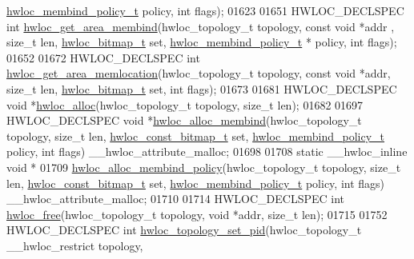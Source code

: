 \begin{DoxyCode}
      \hyperlink{a00191_gac9764f79505775d06407b40f5e4661e8}{hwloc\_membind\_policy\_t} policy, \textcolor{keywordtype}{int} flags);
01623 
01651 HWLOC\_DECLSPEC \textcolor{keywordtype}{int} \hyperlink{a00191_gaa87e0a6946ff145914fdf0b1c60567f8}{hwloc\_get\_area\_membind}(hwloc\_topology\_t topology, \textcolor{keyword}{const} \textcolor{keywordtype}{void} *addr
      , \textcolor{keywordtype}{size\_t} len, \hyperlink{a00205_gaa3c2bf4c776d603dcebbb61b0c923d84}{hwloc\_bitmap\_t} \textcolor{keyword}{set}, \hyperlink{a00191_gac9764f79505775d06407b40f5e4661e8}{hwloc\_membind\_policy\_t} * policy, \textcolor{keywordtype}{int} 
      flags);
01652 
01672 HWLOC\_DECLSPEC \textcolor{keywordtype}{int} \hyperlink{a00191_ga537c7508a4e2d1db05673ec5be6e805c}{hwloc\_get\_area\_memlocation}(hwloc\_topology\_t topology, \textcolor{keyword}{const} \textcolor{keywordtype}{
      void} *addr, \textcolor{keywordtype}{size\_t} len, \hyperlink{a00205_gaa3c2bf4c776d603dcebbb61b0c923d84}{hwloc\_bitmap\_t} \textcolor{keyword}{set}, \textcolor{keywordtype}{int} flags);
01673 
01681 HWLOC\_DECLSPEC \textcolor{keywordtype}{void} *\hyperlink{a00191_ga972b335a86a7d5e7b34bce2b243c41bc}{hwloc\_alloc}(hwloc\_topology\_t topology, \textcolor{keywordtype}{size\_t} len);
01682 
01697 HWLOC\_DECLSPEC \textcolor{keywordtype}{void} *\hyperlink{a00191_ga04736461780fadcf193af218c0122273}{hwloc\_alloc\_membind}(hwloc\_topology\_t topology, \textcolor{keywordtype}{size\_t} len, 
      \hyperlink{a00205_gae991a108af01d408be2776c5b2c467b2}{hwloc\_const\_bitmap\_t} \textcolor{keyword}{set}, \hyperlink{a00191_gac9764f79505775d06407b40f5e4661e8}{hwloc\_membind\_policy\_t} policy, \textcolor{keywordtype}{int} 
      flags) \_\_hwloc\_attribute\_malloc;
01698 
01708 \textcolor{keyword}{static} \_\_hwloc\_inline \textcolor{keywordtype}{void} *
01709 \hyperlink{a00191_gab1b77b8408bacaf03c7e8878f7577922}{hwloc\_alloc\_membind\_policy}(hwloc\_topology\_t topology, \textcolor{keywordtype}{size\_t} len, 
      \hyperlink{a00205_gae991a108af01d408be2776c5b2c467b2}{hwloc\_const\_bitmap\_t} \textcolor{keyword}{set}, \hyperlink{a00191_gac9764f79505775d06407b40f5e4661e8}{hwloc\_membind\_policy\_t} policy, \textcolor{keywordtype}{int} 
      flags) \_\_hwloc\_attribute\_malloc;
01710 
01714 HWLOC\_DECLSPEC \textcolor{keywordtype}{int} \hyperlink{a00191_ga32dbd4f54e9e4a7179f2dde37ffe6ad7}{hwloc\_free}(hwloc\_topology\_t topology, \textcolor{keywordtype}{void} *addr, \textcolor{keywordtype}{size\_t} len);
01715 
01752 HWLOC\_DECLSPEC \textcolor{keywordtype}{int} \hyperlink{a00192_ga341fc17b5867a4715570baab131f68cd}{hwloc\_topology\_set\_pid}(hwloc\_topology\_t \_\_hwloc\_restrict topology,

\end{DoxyCode}
